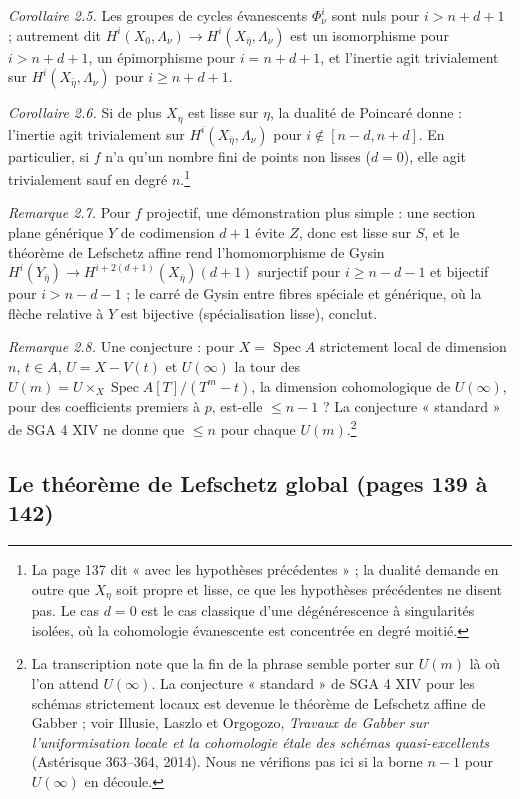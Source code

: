 \documentclass[11pt,a4paper]{article}
\begin{document}
\emph{Corollaire 2.5.} Les groupes de cycles évanescents $\Phi^i_\nu$ sont nuls
pour $i > n + d + 1$ ; autrement dit $H^i(X_0, \Lambda_\nu) \to
H^i(X_{\bar\eta}, \Lambda_\nu)$ est un isomorphisme pour $i > n + d + 1$, un
épimorphisme pour $i = n + d + 1$, et l'inertie agit trivialement sur
$H^i(X_{\bar\eta}, \Lambda_\nu)$ pour $i \geq n + d + 1$.

\emph{Corollaire 2.6.} Si de plus $X_\eta$ est lisse sur $\eta$, la dualité de
Poincaré donne : l'inertie agit trivialement sur $H^i(X_{\bar\eta},
\Lambda_\nu)$ pour $i \notin [n - d, n + d]$. En particulier, si $f$ n'a qu'un
nombre fini de points non lisses ($d = 0$), elle agit trivialement sauf en
degré $n$.\footnote{La page 137 dit « avec les hypothèses précédentes » ; la
dualité demande en outre que $X_\eta$ soit propre et lisse, ce que les
hypothèses précédentes ne disent pas. Le cas $d = 0$ est le cas classique d'une
dégénérescence à singularités isolées, où la cohomologie évanescente est
concentrée en degré moitié.}

\emph{Remarque 2.7.} Pour $f$ projectif, une démonstration plus simple : une
section plane générique $Y$ de codimension $d+1$ évite $Z$, donc est lisse sur
$S$, et le théorème de Lefschetz affine rend l'homomorphisme de Gysin
$H^i(Y_{\bar\eta}) \to H^{i+2(d+1)}(X_{\bar\eta})(d+1)$ surjectif pour
$i \geq n - d - 1$ et bijectif pour $i > n - d - 1$ ; le carré de Gysin entre
fibres spéciale et générique, où la flèche relative à $Y$ est bijective
(spécialisation lisse), conclut.

\emph{Remarque 2.8.} Une conjecture : pour $X = \operatorname{Spec} A$ strictement
local de dimension $n$, $t \in A$, $U = X - V(t)$ et $U(\infty)$ la tour des
$U(m) = U \times_X \operatorname{Spec} A[T]/(T^m - t)$, la dimension cohomologique
de $U(\infty)$, pour des coefficients premiers à $p$, est-elle $\leq n - 1$ ?
La conjecture « standard » de SGA 4 XIV ne donne que $\leq n$ pour
chaque $U(m)$.\footnote{La transcription note que la fin de la phrase semble
porter sur $U(m)$ là où l'on attend $U(\infty)$. La conjecture « standard » de
SGA 4 XIV pour les schémas strictement locaux est devenue le théorème de
Lefschetz affine de Gabber ; voir Illusie, Laszlo et Orgogozo,
\emph{Travaux de Gabber sur l'uniformisation locale et la cohomologie étale des
schémas quasi-excellents} (Astérisque 363--364, 2014). Nous ne vérifions pas ici
si la borne $n-1$ pour $U(\infty)$ en découle.}

\subsection*{Le théorème de Lefschetz global (pages 139 à 142)}
\end{document}
